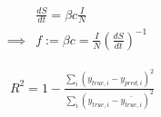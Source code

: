 \documentclass[11pt]{article}
\begin{document}
\begin{align*}
    & \frac{dS}{dt} = \beta c \frac{I}{N} \\
    \implies &f := \beta c = \frac{I}{N} \left(\frac{dS}{dt}\right)^{-1}
\end{align*}

\begin{align*}
& R^2 = 1 - \frac{\sum_i (y_{true, i} - y_{pred, i})^2}{\sum_i (y_{true, i} - \bar{y_{true,i}})^2}
\end{align*}
\end{document}

